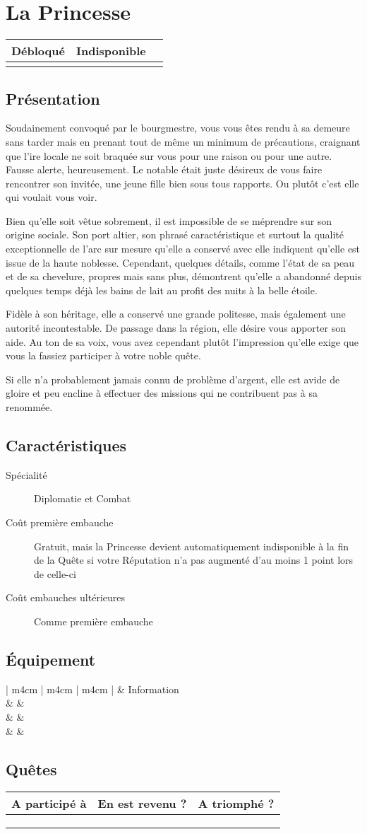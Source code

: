 \documentclass{report}
\newcommand{\hero}[5]{
    \herostats{#1}{#2}{#3}{#4}

    \fullbleed{#5}

    \herosheet
}
\newcommand{\herostats}[4]{
    \section{Présentation}

    #1

    \section{Caractéristiques}

    \begin{description}
        \item[Spécialité] #2
        \item[Coût première embauche] #3
        \item[Coût embauches ultérieures] #4
    \end{description}
}
\newcommand{\herosheet}{
    \section{Équipement}

    \begin{tabular}{ | m{4cm} | m{4cm} | m{4cm} | }
        \hline
        \multicolumn{2}{| m{8cm} |}{Équipement} & Information\\
        \hline
        \mytextfield{4cm} & \mytextfield{4cm} & \mytextfield{4cm}\\
        \hline
        \mytextfield{4cm} & \mytextfield{4cm} & \mytextfield{4cm}\\
        \hline
        \mytextfield{4cm} & \mytextfield{4cm} & \mytextfield{4cm}\\
        \hline
    \end{tabular}

    \section{Quêtes}

    \begin{tabular}{ | m{7cm} | m{2.5cm} | m{2.5cm} |}
        \hline
        A participé à & En est revenu ? & A triomphé ?\\
        \hline
        \mytextfield{7cm} & \mycheckbox & \mycheckbox \\ 
        \hline
        \mytextfield{7cm} & \mycheckbox & \mycheckbox \\ 
        \hline
        \mytextfield{7cm} & \mycheckbox & \mycheckbox \\ 
        \hline
    \end{tabular}
}
\newcommand{\lockedhero}{
\begin{tabular}{ | m{4cm} | m{4cm} | m{4cm} | }
    \hline
    Débloqué & Indisponible\\
    \hline
    \mycheckbox & \mycheckbox \\
    \hline
\end{tabular}
}
\begin{document}
\chapter{La Princesse}

\lockedhero

\hero{
Soudainement convoqué par le bourgmestre, vous vous êtes rendu à sa demeure sans tarder mais en prenant tout de même un minimum de précautions, craignant que l'ire locale ne soit braquée sur vous pour une raison ou pour une autre. Fausse alerte, heureusement. Le notable était juste désireux de vous faire rencontrer son invitée, une jeune fille bien sous tous rapports. Ou plutôt c'est elle qui voulait vous voir.

Bien qu'elle soit vêtue sobrement, il est impossible de se méprendre sur son origine sociale. Son port altier, son phrasé caractéristique et surtout la qualité exceptionnelle de l'arc sur mesure qu'elle a conservé avec elle indiquent qu'elle est issue de la haute noblesse. Cependant, quelques détails, comme l'état de sa peau et de sa chevelure, propres mais sans plus, démontrent qu'elle a abandonné depuis quelques temps déjà les bains de lait au profit des nuits à la belle étoile.

Fidèle à son héritage, elle a conservé une grande politesse, mais également une autorité incontestable. De passage dans la région, elle désire vous apporter son aide. Au ton de sa voix, vous avez cependant plutôt l'impression qu'elle exige que vous la fassiez participer à votre noble quête.

Si elle n'a probablement jamais connu de problème d'argent, elle est avide de gloire et peu encline à effectuer des missions qui ne contribuent pas à sa renommée.
}{
Diplomatie et Combat
}{
Gratuit, mais la Princesse devient automatiquement indisponible à la fin de la Quête si votre Réputation n'a pas augmenté d'au moins 1 point lors de celle-ci
}{
Comme première embauche
}{images/princess.jpg}
\end{document}
